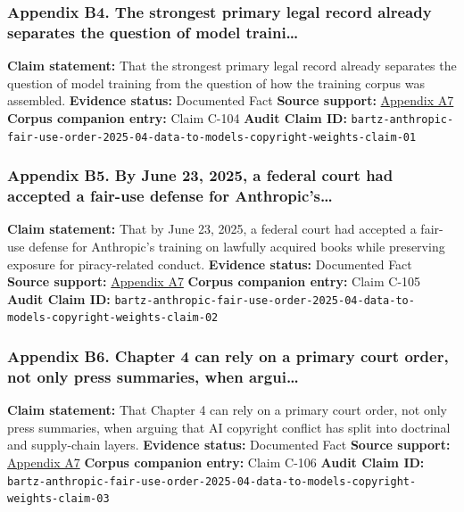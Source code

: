 \documentclass[
  american,
  11pt,
  letterpaper,
]{article}
\begin{document}
\subsubsection{Appendix B4. The strongest primary legal record already
separates the question of model
traini\ldots{}}\label{appendix-b4-the-strongest-primary-legal-record-already-separates-the-question-of-model-traini}

\textbf{Claim statement:} That the strongest primary legal record
already separates the question of model training from the question of
how the training corpus was assembled. \textbf{Evidence status:}
Documented Fact \textbf{Source support:}
\hyperref[appendix-a7-bartz-et-al-v-anthropic-pbc-order-on-fair-use]{Appendix
A7} \textbf{Corpus companion entry:} Claim C-104 \textbf{Audit Claim
ID:}
\texttt{bartz-anthropic-fair-use-order-2025-04-data-to-models-copyright-weights-claim-01}

\subsubsection{Appendix B5. By June 23, 2025, a federal court had
accepted a fair-use defense for
Anthropic's\ldots{}}\label{appendix-b5-by-june-23-2025-a-federal-court-had-accepted-a-fair-use-defense-for-anthropic-s}

\textbf{Claim statement:} That by June 23, 2025, a federal court had
accepted a fair-use defense for Anthropic's training on lawfully
acquired books while preserving exposure for piracy-related conduct.
\textbf{Evidence status:} Documented Fact \textbf{Source support:}
\hyperref[appendix-a7-bartz-et-al-v-anthropic-pbc-order-on-fair-use]{Appendix
A7} \textbf{Corpus companion entry:} Claim C-105 \textbf{Audit Claim
ID:}
\texttt{bartz-anthropic-fair-use-order-2025-04-data-to-models-copyright-weights-claim-02}

\subsubsection{Appendix B6. Chapter 4 can rely on a primary court order,
not only press summaries, when
argui\ldots{}}\label{appendix-b6-chapter-4-can-rely-on-a-primary-court-order-not-only-press-summaries-when-argui}

\textbf{Claim statement:} That Chapter 4 can rely on a primary court
order, not only press summaries, when arguing that AI copyright conflict
has split into doctrinal and supply-chain layers. \textbf{Evidence
status:} Documented Fact \textbf{Source support:}
\hyperref[appendix-a7-bartz-et-al-v-anthropic-pbc-order-on-fair-use]{Appendix
A7} \textbf{Corpus companion entry:} Claim C-106 \textbf{Audit Claim
ID:}
\texttt{bartz-anthropic-fair-use-order-2025-04-data-to-models-copyright-weights-claim-03}
\end{document}
